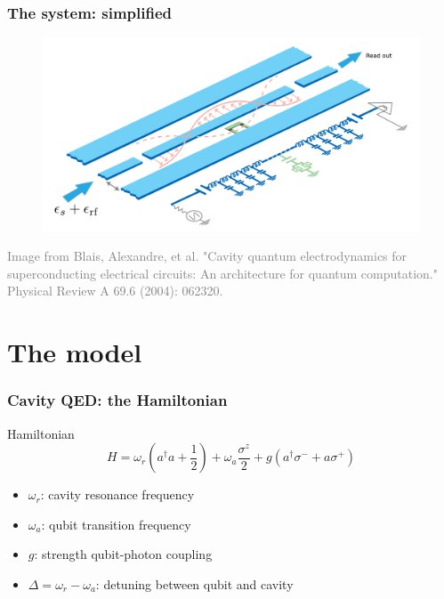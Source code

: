 \documentclass[xcolor=dvipsnames,hyperref={CJKbookmarks=true},aspectratio=169]{beamer}
\begin{document}
\begin{frame}
\frametitle{The system: simplified}
\begin{figure}
\centering
\includegraphics[width=0.85\linewidth]{cavity.png}
\end{figure}
\tiny{\textcolor{gray}{Image from Blais, Alexandre, et al. "Cavity quantum electrodynamics for superconducting electrical circuits: An architecture for quantum computation." Physical Review A 69.6 (2004): 062320.\cite{blais2004cavity}}}
\end{frame}

\section{The model}
\begin{frame}
\frametitle{Cavity QED: the Hamiltonian}
\begin{block}{Hamiltonian}
$$H =  \omega_r \left(a^{\dagger} a+ \dfrac{1}{2} \right) +  \omega_a \dfrac{\sigma^{z}}{2}+  g \left(a^{\dagger}\sigma^{-}+a\sigma^{+}\right)$$
\end{block}
\vspace{0.5cm}
\begin{itemize}
\item $\omega_r$: cavity resonance frequency
\vspace{0.3cm}
\item $\omega_a$: qubit transition frequency
\vspace{0.3cm}
\item $g$: strength qubit-photon coupling
\vspace{0.3cm}
\item $\Delta = \omega_r - \omega_a$: detuning between qubit and cavity
\end{itemize}
\end{frame}
\end{document}
